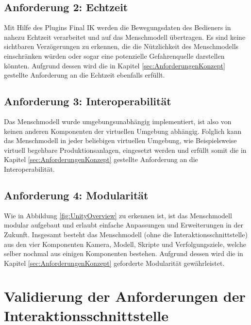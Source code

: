 \subsection{Anforderung 2: Echtzeit}\label{sec:ValidMensch2}
Mit Hilfe des Plugins Final IK werden die Bewegungsdaten des Bedieners in nahezu Echtzeit verarbeitet und auf das Menschmodell übertragen. Es sind keine sichtbaren Verzögerungen zu erkennen, die die Nützlichkeit des Menschmodells einschränken würden oder sogar eine potenzielle Gefahrenquelle darstellen könnten. Aufgrund dessen wird die in Kapitel \ref{sec:AnforderungenKonzept} gestellte Anforderung an die Echtzeit ebenfalls erfüllt.

\subsection{Anforderung 3: Interoperabilität}\label{sec:ValidMensch3}
Das Menschmodell wurde umgebungsunabhängig implementiert, ist also von keinen anderen Komponenten der virtuellen Umgebung abhängig. Folglich kann das Menschmodell in jeder beliebigen virtuellen Umgebung, wie Beispielsweise virtuell begehbare Produktionsanlagen, eingesetzt werden und erfüllt somit die in Kapitel \ref{sec:AnforderungenKonzept} gestellte Anforderung an die Interoperabilität.

\subsection{Anforderung 4: Modularität}\label{sec:ValidMensch4}
Wie in Abbildung \ref{fig:UnityOverview} zu erkennen ist, ist das Menschmodell modular aufgebaut und erlaubt einfache Anpassungen und Erweiterungen in der Zukunft. Insgesamt besteht das Menschmodell (ohne die Interaktionsschnittstelle) aus den vier Komponenten Kamera, Modell, Skripte und Verfolgungsziele, welche selber nochmal aus einigen Komponenten bestehen. Aufgrund dessen wird die in Kapitel \ref{sec:AnforderungenKonzept} geforderte Modularität gewährleistet.

\section{Validierung der Anforderungen der Interaktionsschnittstelle}\label{sec:ValidInteraktion}

